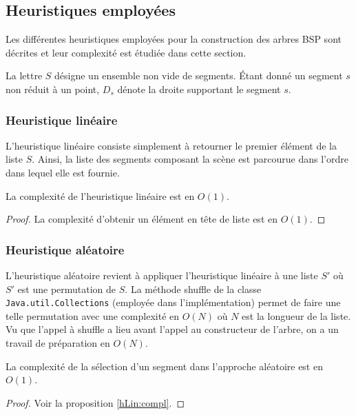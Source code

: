 \subsection{Heuristiques employées}\label{heur:section}
Les différentes heuristiques employées pour la construction des arbres
BSP sont décrites et leur complexité est étudiée dans cette section.

La lettre $S$ désigne un ensemble non vide de segments. \'Etant donné
un segment $s$ non réduit à un point, $D_s$ dénote la droite
supportant le segment $s$.
\subsubsection*{Heuristique linéaire}
L'heuristique linéaire consiste simplement à retourner le premier
élément de la liste $S$. Ainsi, la liste des segments composant
la scène est parcourue dans l'ordre dans lequel elle est fournie.

\begin{prop}\label{hLin:compl}
 La complexité de l'heuristique linéaire est en $O(1)$.
\end{prop}
\begin{proof}
  La complexité d'obtenir un élément en tête de liste
  est en $O(1)$.
\end{proof}

\subsubsection*{Heuristique aléatoire}

L'heuristique aléatoire revient à appliquer l'heuristique linéaire
à une liste $S'$ où $S'$ est une permutation de $S$. La méthode
shuffle de la classe \texttt{Java.util.Collections}
(employée dans l'implémentation) permet de faire
une telle permutation avec une complexité en $O(N)$
où $N$ est la longueur de la liste.
Vu que l'appel à shuffle a lieu avant l'appel au constructeur de l'arbre,
on a un travail de préparation en $O(N)$.

\begin{prop}
  La complexité de la sélection d'un segment dans
  l'approche aléatoire est en $O(1)$.
\end{prop}
\begin{proof}
  Voir la proposition \ref{hLin:compl}.
\end{proof}



